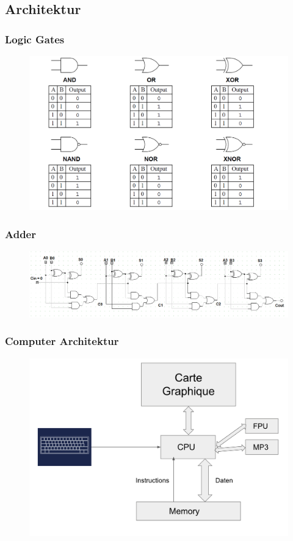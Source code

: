 \documentclass{beamer}
\begin{document}
\subsection{Architektur}

\begin{frame}
\frametitle{Logic Gates}
\begin{figure}
\centering
\includegraphics[width=\textwidth]{logic_gates.png}
\label{Logic Gates}
\end{figure}
\end{frame}

\begin{frame}
\frametitle{Adder}
\begin{figure}
\centering
\includegraphics[width=\textwidth]{4bit_adder_3.png}
\label{Adder}
\end{figure}
\end{frame}

\begin{frame}
\frametitle{Computer Architektur}
\begin{figure}
\centering
\includegraphics[width=\textwidth]{cpu.png}
\label{cpu}
\end{figure}
\end{frame}
\end{document}
